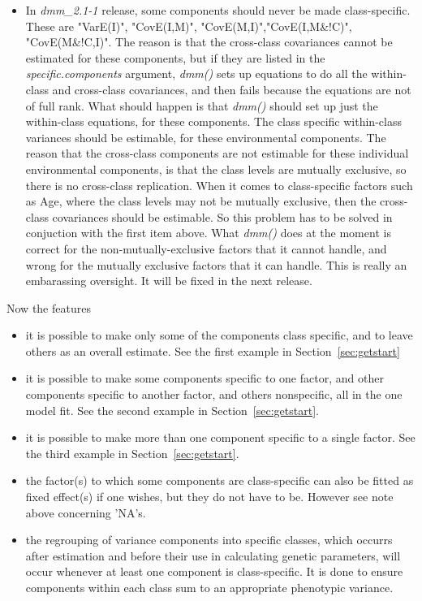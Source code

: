 \documentclass[titlepage]{article}  %
\begin{document}
\begin{itemize}
\item In {\em dmm\_2.1-1} release, some components should never be made class-specific. These are "VarE(I)",  "CovE(I,M)", "CovE(M,I)","CovE(I,M\&!C)", "CovE(M\&!C,I)". The reason is that the cross-class covariances cannot be estimated for these components, but if they are listed in the {\em specific.components} argument, {\em dmm()} sets up equations to do all the within-class and cross-class covariances, and then fails because the equations are not of full rank. What should happen is that {\em dmm()} should set up just the within-class equations, for these components. The class specific within-class variances should be estimable, for these environmental components.   The reason that the cross-class components are not estimable for these individual environmental components, is that the class levels are mutually exclusive, so there is no cross-class replication. When it comes to class-specific factors such as Age, where the class levels may not be mutually exclusive, then the cross-class covariances should be estimable. So this problem has to be solved in conjuction with the first item above. What {\em dmm()} does at the moment is correct for the non-mutually-exclusive factors that it cannot handle, and wrong for the mutually exclusive factors that it can handle. This is really an embarassing oversight. It will be fixed in the next release.
\end{itemize}
 
Now the features
\begin{itemize}
\item  it is possible to make only some of the components class specific, and to leave others as an overall estimate. See the first example in Section~\ref{sec:getstart}
\item  it is possible to make some components specific to one factor, and other components specific to another factor, and others nonspecific, all in the one model fit. See the second example in Section~\ref{sec:getstart}.
\item it is possible to make more than one component specific to a single factor. See the third example in Section~\ref{sec:getstart}.
\item  the factor(s) to which some components are class-specific can also be fitted as fixed effect(s) if one wishes, but they do not have to be. However see note above concerning 'NA's.
\item the regrouping of variance components into specific classes, which occurrs after estimation and before their use in calculating genetic parameters, will occur whenever at least one component is class-specific. It is done to ensure components within each class sum to an appropriate phenotypic variance.
\end{itemize}
\end{document}
